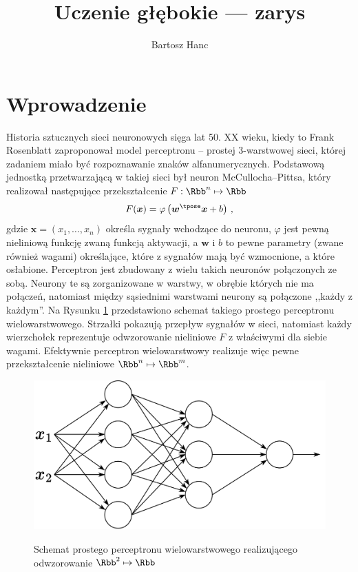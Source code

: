 \documentclass{myclass}
\author{Bartosz Hanc}
\title{Uczenie głębokie --- zarys}
\begin{document}
\maketitle

\section{Wprowadzenie}

Historia sztucznych sieci neuronowych sięga lat 50. XX wieku, kiedy to Frank Rosenblatt zaproponował
model perceptronu -- prostej 3-warstwowej sieci, której zadaniem miało być rozpoznawanie znaków
alfanumerycznych. Podstawową jednostką przetwarzającą w takiej sieci był neuron McCullocha--Pittsa,
który realizował następujące przekształcenie \(F: \Rbb^n \mapsto \Rbb\)
\[
    F(\bm{x}) = \varphi \left( \bm{w}^\tpose \bm{x} + b \right)\,,
\]
gdzie \(\bm{x} = (x_1, \ldots, x_n)\) określa sygnały wchodzące do neuronu, \(\varphi\) jest pewną
nieliniową funkcję zwaną funkcją aktywacji, a \(\bm{w}\) i \(b\) to pewne parametry (zwane również
wagami) określające, które z sygnałów mają być wzmocnione, a które osłabione. Perceptron jest
zbudowany z wielu takich neuronów połączonych ze sobą. Neurony te są zorganizowane w warstwy, w
obrębie których nie ma połączeń, natomiast między sąsiednimi warstwami neurony są połączone ,,każdy
z każdym''. Na Rysunku \ref{fig:nn} przedstawiono schemat takiego prostego perceptronu
wielowarstwowego. Strzałki pokazują przepływ sygnałów w sieci, natomiast każdy wierzchołek
reprezentuje odwzorowanie nieliniowe \(F\) z właściwymi dla siebie wagami. Efektywnie perceptron
wielowarstwowy realizuje więc pewne przekształcenie nieliniowe \(\Rbb^n \mapsto \Rbb^m\).

\begin{figure}[ht]
    \centering
    \includegraphics[width=0.85\linewidth]{figs/nn.png}
    \label{fig:nn}
    \caption{Schemat prostego perceptronu wielowarstwowego realizującego odwzorowanie \(\Rbb^2 \mapsto \Rbb\)}
\end{figure}
\end{document}
